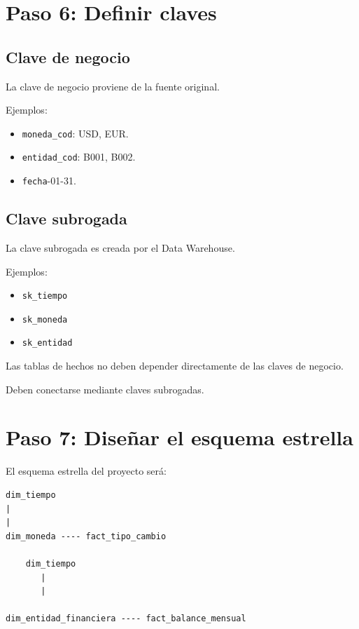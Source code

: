 \section{Paso 6: Definir claves}

\subsection{Clave de negocio}

La clave de negocio proviene de la fuente original.

Ejemplos:

\begin{itemize}
\item \texttt{moneda\_cod}: USD, EUR.
\item \texttt{entidad\_cod}: B001, B002.
\item \texttt{fecha}-01-31.
\end{itemize}

\subsection{Clave subrogada}

La clave subrogada es creada por el Data Warehouse.

Ejemplos:

\begin{itemize}
\item \texttt{sk\_tiempo}
\item \texttt{sk\_moneda}
\item \texttt{sk\_entidad}
\end{itemize}

Las tablas de hechos no deben depender directamente de las claves de negocio.

Deben conectarse mediante claves subrogadas.

\section{Paso 7: Diseñar el esquema estrella}

El esquema estrella del proyecto será:

\begin{verbatim}
dim_tiempo
|
|
dim_moneda ---- fact_tipo_cambio

    dim_tiempo
       |
       |

dim_entidad_financiera ---- fact_balance_mensual
\end{verbatim}

